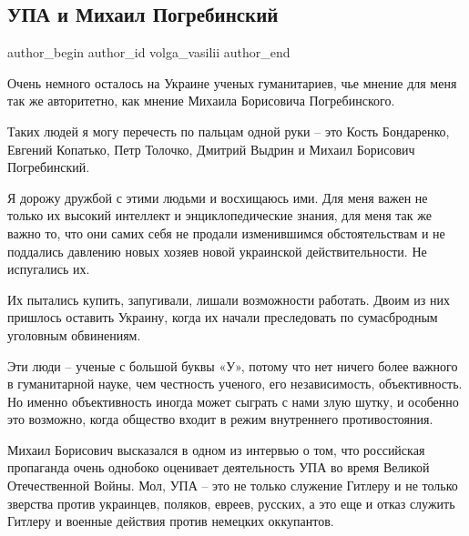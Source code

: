  
 
 
 
 
 
\subsection{УПА и Михаил Погребинский}
\label{sec:29_11_2020.fb.volga_vasilii.1.upa_mihail_pogrebinskii}
\ifcmt
	author_begin
   author_id volga_vasilii
	author_end
\fi

Очень немного осталось на Украине ученых гуманитариев, чье мнение для меня так
же авторитетно, как мнение Михаила Борисовича Погребинского. 

Таких людей я могу перечесть по пальцам одной руки – это Кость Бондаренко,
Евгений Копатько, Петр Толочко, Дмитрий Выдрин и Михаил Борисович Погребинский. 

Я дорожу дружбой с этими людьми и восхищаюсь ими. Для меня важен не только их
высокий интеллект и энциклопедические знания, для меня так же важно то, что они
самих себя не продали изменившимся обстоятельствам и не поддались давлению
новых хозяев новой украинской действительности. Не испугались их.

Их пытались купить, запугивали, лишали возможности работать. Двоим из них
пришлось оставить Украину, когда их начали преследовать по сумасбродным
уголовным обвинениям. 

Эти люди – ученые с большой буквы «У», потому что нет ничего более важного в
гуманитарной науке, чем честность ученого, его независимость, объективность.
Но именно объективность иногда может сыграть с нами злую шутку, и особенно это
возможно, когда общество входит в режим внутреннего противостояния. 

Михаил Борисович высказался в одном из интервью о том, что российская
пропаганда очень однобоко оценивает деятельность УПА во время Великой
Отечественной Войны. Мол, УПА – это не только служение Гитлеру и не только
зверства против украинцев, поляков, евреев, русских, а это еще и отказ служить
Гитлеру и военные действия против немецких оккупантов. 

